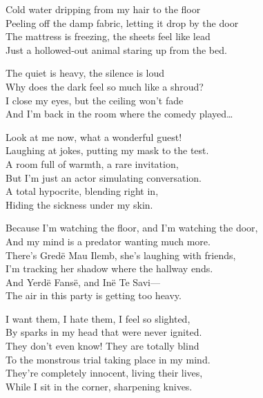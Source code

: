 \begin{lyrics}

Cold water dripping from my hair to the floor\\
Peeling off the damp fabric, letting it drop by the door\\
The mattress is freezing, the sheets feel like lead\\
Just a hollowed-out animal staring up from the bed.

The quiet is heavy, the silence is loud\\
Why does the dark feel so much like a shroud?\\
I close my eyes, but the ceiling won’t fade\\
And I’m back in the room where the comedy played…


Look at me now, what a wonderful guest!\\
Laughing at jokes, putting my mask to the test.\\
A room full of warmth, a rare invitation,\\
But I’m just an actor simulating conversation.\\
A total hypocrite, blending right in,\\
Hiding the sickness under my skin.

Because I’m watching the floor, and I’m watching the door,\\
And my mind is a predator wanting much more.\\
There’s Gredë Mau Ilemb, she’s laughing with friends,\\
I’m tracking her shadow where the hallway ends.\\
And Yerdë Fansë, and Inë Te Savi—\\
The air in this party is getting too heavy.

I want them, I hate them, I feel so slighted,\\
By sparks in my head that were never ignited.\\
They don’t even know! They are totally blind\\
To the monstrous trial taking place in my mind.\\
They’re completely innocent, living their lives,\\
While I sit in the corner, sharpening knives.


\end{lyrics}
